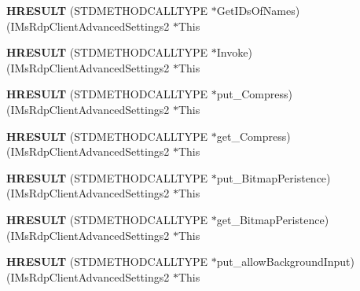 \begin{DoxyCompactItemize}
\mbox{\label{struct_i_ms_rdp_client_advanced_settings2_vtbl_a07695658fcaeb0ec746813787e006a06}} 
{\bfseries H\+R\+E\+S\+U\+LT} (S\+T\+D\+M\+E\+T\+H\+O\+D\+C\+A\+L\+L\+T\+Y\+PE $\ast$Get\+I\+Ds\+Of\+Names)(I\+Ms\+Rdp\+Client\+Advanced\+Settings2 $\ast$This
\item 
\mbox{\label{struct_i_ms_rdp_client_advanced_settings2_vtbl_a28e6e8a8f912e6b46de41c37d44b7241}} 
{\bfseries H\+R\+E\+S\+U\+LT} (S\+T\+D\+M\+E\+T\+H\+O\+D\+C\+A\+L\+L\+T\+Y\+PE $\ast$Invoke)(I\+Ms\+Rdp\+Client\+Advanced\+Settings2 $\ast$This
\item 
\mbox{\label{struct_i_ms_rdp_client_advanced_settings2_vtbl_a63859ea0bf25d69e9b0d61fb230e764a}} 
{\bfseries H\+R\+E\+S\+U\+LT} (S\+T\+D\+M\+E\+T\+H\+O\+D\+C\+A\+L\+L\+T\+Y\+PE $\ast$put\+\_\+\+Compress)(I\+Ms\+Rdp\+Client\+Advanced\+Settings2 $\ast$This
\item 
\mbox{\label{struct_i_ms_rdp_client_advanced_settings2_vtbl_afabbe992ba1fda30c591bfeeb9b3c536}} 
{\bfseries H\+R\+E\+S\+U\+LT} (S\+T\+D\+M\+E\+T\+H\+O\+D\+C\+A\+L\+L\+T\+Y\+PE $\ast$get\+\_\+\+Compress)(I\+Ms\+Rdp\+Client\+Advanced\+Settings2 $\ast$This
\item 
\mbox{\label{struct_i_ms_rdp_client_advanced_settings2_vtbl_a0dd13ca6e4e0745dfd6e156f5aff7479}} 
{\bfseries H\+R\+E\+S\+U\+LT} (S\+T\+D\+M\+E\+T\+H\+O\+D\+C\+A\+L\+L\+T\+Y\+PE $\ast$put\+\_\+\+Bitmap\+Peristence)(I\+Ms\+Rdp\+Client\+Advanced\+Settings2 $\ast$This
\item 
\mbox{\label{struct_i_ms_rdp_client_advanced_settings2_vtbl_a109baff0dafb15ec52847f544dd05b59}} 
{\bfseries H\+R\+E\+S\+U\+LT} (S\+T\+D\+M\+E\+T\+H\+O\+D\+C\+A\+L\+L\+T\+Y\+PE $\ast$get\+\_\+\+Bitmap\+Peristence)(I\+Ms\+Rdp\+Client\+Advanced\+Settings2 $\ast$This
\item 
\mbox{\label{struct_i_ms_rdp_client_advanced_settings2_vtbl_a652f4514d84a18399a1a05c4faff99a5}} 
{\bfseries H\+R\+E\+S\+U\+LT} (S\+T\+D\+M\+E\+T\+H\+O\+D\+C\+A\+L\+L\+T\+Y\+PE $\ast$put\+\_\+allow\+Background\+Input)(I\+Ms\+Rdp\+Client\+Advanced\+Settings2 $\ast$This

\end{DoxyCompactItemize}
